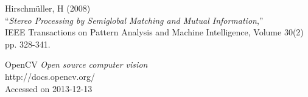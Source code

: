 \begin{thebibliography}{9}
	Hirschmüller, H (2008)\\
	``\textit{Stereo Processing by Semiglobal Matching and Mutual Information},''\\
	IEEE Transactions on Pattern Analysis and Machine Intelligence, Volume 30(2)
	pp. 328-341.
	
	OpenCV \textit{Open source computer vision}\\
	http://docs.opencv.org/\\
	Accessed on 2013-12-13\\
	


\end{thebibliography}